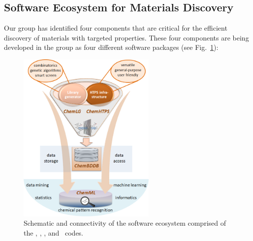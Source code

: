 \subsection{Software Ecosystem for Materials Discovery}

Our group has identified four components that are critical for the efficient discovery of materials with targeted properties. These four components are being developed in the group as four different software packages (see Fig.\ \ref{fig:ecosystem}):
 
\begin{figure}[htbp]
	\centering
	\includegraphics[width=0.6\textwidth]{Chapter-1/Figures/ecosystem.png}
	\caption{Schematic and connectivity of the software ecosystem comprised of the \chemlg , \chemhtps , \chembddb , and \chemml\  codes.}
	\label{fig:ecosystem}
\end{figure}

